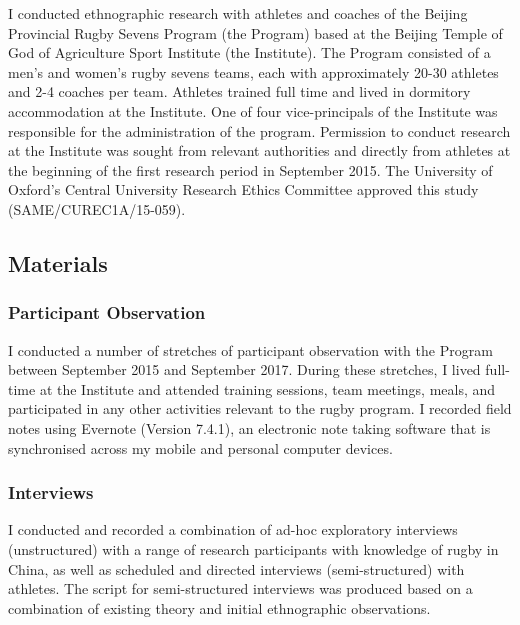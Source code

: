 \begin{CJK}{UTF8}{gbsn}
I conducted ethnographic research with athletes and coaches of the Beijing Provincial Rugby Sevens Program (the Program) based at the Beijing Temple of God of Agriculture Sport Institute (the Institute).  The Program consisted of a men's and women's rugby sevens teams, each with approximately 20-30 athletes and 2-4 coaches per team.  Athletes trained full time and lived in dormitory accommodation at the Institute.  One of four vice-principals of the Institute was responsible for the administration of the program.  Permission to conduct research at the Institute was sought from relevant authorities and directly from athletes at the beginning of the first research period in September 2015. The University of Oxford’s Central University Research Ethics Committee approved this study (SAME/CUREC1A/15-059).


\subsection{Materials}

  \subsubsection{Participant Observation}
   I conducted a number of stretches of participant observation with the Program between September 2015 and September 2017.  During these stretches, I lived full-time at the Institute and attended training sessions, team meetings, meals, and participated in any other activities relevant to the rugby program.  I recorded field notes using Evernote (Version 7.4.1), an electronic note taking software that is synchronised across my mobile and personal computer devices.

  \subsubsection{Interviews}
  I conducted and recorded a combination of ad-hoc exploratory interviews (unstructured) with a range of research participants with knowledge of rugby in China, as well as scheduled and directed interviews (semi-structured) with athletes.  The script for semi-structured interviews was produced based on a combination of existing theory and initial ethnographic observations.


\end{CJK}

